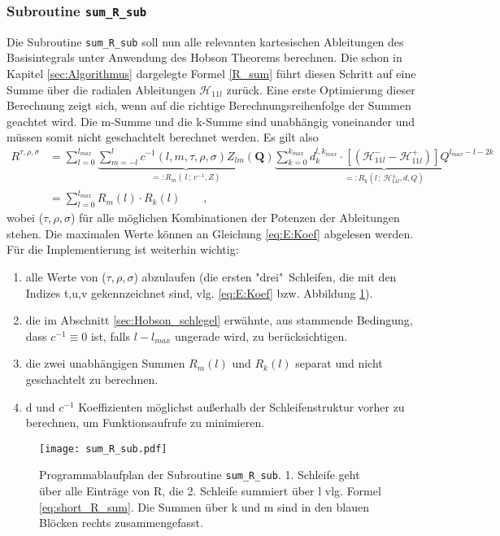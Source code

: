 \subsubsection{Subroutine \texttt{sum\_R\_sub}}
%
Die Subroutine \texttt{sum\_R\_sub} soll nun alle relevanten kartesischen 
Ableitungen des Basisintegrals unter Anwendung des Hobson Theorems berechnen. 
Die schon in Kapitel 
\ref{sec:Algorithmus} dargelegte Formel \ref{R_sum} 
führt diesen Schritt auf eine Summe über die radialen Ableitungen 
$\mathcal{H}_{11l}$ zurück. Eine erste Optimierung dieser Berechnung zeigt 
sich, wenn auf die richtige Berechnungsreihenfolge der Summen geachtet wird. 
Die m-Summe 
und die k-Summe sind unabhängig voneinander und müssen somit nicht 
geschachtelt berechnet werden. Es gilt also
%
\begin{align}\nonumber
R^{\tau,\rho,\sigma}&=\sum_{l=0}^{l_{max}} 
%
\underset{=:R_m(\,l\,;\,c^{-1},Z)}{\underbrace{\sum_{m=-l}^{l}c^{-1}(l,m,\tau,\rho,\sigma)Z_{lm}(\textbf{Q})}}
%
\underset{=:R_k(l\, ;\, 
\mathcal{H}^\pm_{11l},d,Q)}{\underbrace{\sum_{k=0}^{k_{max}}d_k^{l,k_{max}} 
\cdot 
\left[(\mathcal{H}^-_{11l}-\mathcal{H}^+_{11l})\right]Q^{l_{max}-l-2k}}}\\\label{eq:short_R_sum}
%
&=\sum_{l=0}^{l_{max}}R_m(l)\cdot R_k(l)\qquad,
\end{align}
%
wobei ($\tau,\rho,\sigma$) für alle möglichen  Kombinationen der Potenzen der 
Ableitungen stehen. Die maximalen Werte können an Gleichung \ref{eq:E:Koef} 
abgelesen werden.\\
Für die Implementierung ist weiterhin wichtig:
\begin{enumerate}
	\item alle Werte von ($\tau,\rho,\sigma$) abzulaufen (die ersten "drei"\  
	Schleifen, die mit den Indizes t,u,v gekennzeichnet sind, vlg. 
	\ref{eq:E:Koef} bzw. Abbildung \ref{pic:FC:sum_R_sub}).
	\item die im Abschnitt \ref{sec:Hobson_schlegel} 
	erwähnte, aus \cite{av:9a} stammende Bedingung, dass $c^{-1}\equiv0$ ist, 
	falls $l-l_{max}$ ungerade wird, zu berücksichtigen.
	\item die zwei unabhängigen Summen $R_m(l)$ und $R_k(l)$ separat und nicht 
	geschachtelt zu berechnen.
	\item d und $c^{-1}$ Koeffizienten möglichst außerhalb der 
	Schleifenstruktur vorher zu berechnen, um Funktionsaufrufe zu minimieren. 
\end{enumerate}
%
\begin{figure}[H] \centering
	\texttt{[image: sum\_R\_sub.pdf]}
	\caption{Programmablaufplan der Subroutine 
	\texttt{sum\_R\_sub}. 1. Schleife geht über alle 
	Einträge von R, die 2. Schleife summiert über l 
	vlg. Formel \ref{eq:short_R_sum}. Die Summen über k 
	und m sind in den blauen 
	Blöcken rechts zusammengefasst.}
	\label{pic:FC:sum_R_sub} 
\end{figure}
